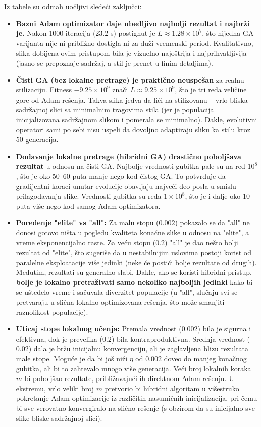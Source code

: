 \documentclass[a4paper,12pt]{article}
\begin{document}
\newpage
Iz tabele su odmah uočljivi sledeći zaključci:
\begin{itemize}
\item \textbf{Bazni Adam optimizator daje ubedljivo najbolji rezultat i najbrži je.} Nakon 1000 iteracija (23.2 s) postignut je $L\approx1.28\times10^7$, što nijedna GA varijanta nije ni približno dostigla ni za duži vremenski period. Kvalitativno, slika dobijena ovim pristupom bila je vizuelno najoštrija i najprihvatljivija (jasno se prepoznaje sadržaj, a stil je prenet u finim detaljima).
\item \textbf{Čisti GA (bez lokalne pretrage) je praktično neuspešan} za realnu stilizaciju. Fitness $-9.25\times10^9$ znači $L\approx9.25\times10^9$, što je tri reda veličine gore od Adam rešenja. Takva slika jedva da liči na stilizovanu – vrlo bliska sadržajnoj slici sa minimalnim tragovima stila (jer je populacija inicijalizovana sadržajnom slikom i pomerala se minimalno). Dakle, evolutivni operatori sami po sebi nisu uspeli da dovoljno adaptiraju sliku ka stilu kroz 50 generacija.
\item \textbf{Dodavanje lokalne pretrage (hibridni GA) drastično poboljšava rezultat} u odnosu na čisti GA. Najbolje vrednosti gubitka pale su na red $10^8$, što je oko 50–60 puta manje nego kod čistog GA. To potvrđuje da gradijentni koraci unutar evolucije obavljaju najveći deo posla u smislu prilagođavanja slike. Vrednosti gubitka su reda $1\times10^8$, što je i dalje oko 10 puta više nego kod samog Adam optimizatora.
\item \textbf{Poređenje "elite" vs "all":} Za malu stopu ($0.002$) pokazalo se da "all" ne donosi gotovo ništa u pogledu kvaliteta konačne slike u odnosu na "elite", a vreme eksponencijalno raste. Za veću stopu ($0.2$) "all" je dao nešto bolji rezultat od "elite", što sugeriše da u nestabilnijim uslovima postoji korist od paralelne eksploatacije više jedinki (neke će postići bolje rezultate od drugih). Međutim, rezultati su generalno slabi. Dakle, ako se koristi hibridni pristup, \textbf{bolje je lokalno pretraživati samo nekoliko najboljih jedinki} kako bi se uštedelo vreme i sačuvala diverzitet populacije (u "all", slučaju svi se pretvaraju u slična lokalno-optimizovana rešenja, što može smanjiti raznolikost populacije).
\item \textbf{Uticaj stope lokalnog učenja:} Premala vrednost ($0.002$) bila je sigurna i efektivna, dok je prevelika ($0.2$) bila kontraproduktivna. Srednja vrednost ($0.02$) dala je bržu inicijalnu konvergenciju, ali je zaglavljena blizu rezultata male stope. Moguće je da bi još niži $\eta$ od $0.002$ doveo do manjeg konačnog gubitka, ali bi to zahtevalo mnogo više generacija. Veći broj lokalnih koraka $m$ bi poboljšao rezultate, približavajući ih direktnom Adam rešenju. U ekstremu, vrlo veliki broj $m$ pretvorio bi hibridni algoritam u višestruko pokretanje Adam optimizacije iz različitih nasumičnih inicijalizacija, pri čemu bi sve verovatno konvergiralo na slično rešenje (s obzirom da su inicijalno sve slike bliske sadržajnoj slici).
\end{itemize}
\end{document}
